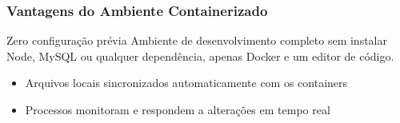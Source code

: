 \begin{frame}
  \frametitle{Vantagens do Ambiente Containerizado}
  \begin{block}{Zero configuração prévia}
    Ambiente de desenvolvimento completo sem instalar Node, MySQL ou qualquer dependência, apenas Docker e um editor de código.
  \end{block}

  \vspace{0.5em}
  \begin{itemize}
    \item Arquivos locais sincronizados automaticamente com os containers
    \item Processos monitoram e respondem a alterações em tempo real
  \end{itemize}
\end{frame}